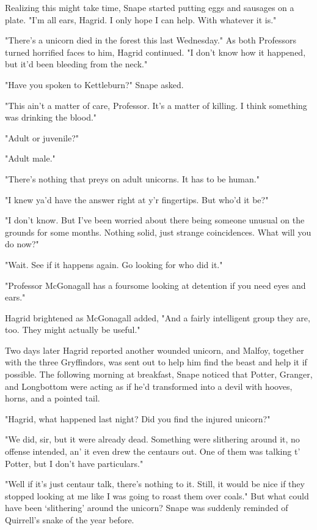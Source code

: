 Realizing this might take time, Snape started putting eggs and sausages on a plate. "I'm all ears, Hagrid. I only hope I can help. With whatever it is."

"There's a unicorn died in the forest this last Wednesday." As both Professors turned horrified faces to him, Hagrid continued. "I don't know how it happened, but it'd been bleeding from the neck."

"Have you spoken to Kettleburn?" Snape asked.

"This ain't a matter of care, Professor. It's a matter of killing. I think something was drinking the blood."

"Adult or juvenile?"

"Adult male."

"There's nothing that preys on adult unicorns. It has to be human."

"I knew ya'd have the answer right at y'r fingertips. But who'd it be?"

"I don't know. But I've been worried about there being someone{\el} unusual{\el} on the grounds for some months. Nothing solid, just strange coincidences. What will you do now?"

"Wait. See if it happens again. Go looking for who did it."

"Professor McGonagall has a foursome looking at detention if you need eyes and ears."

Hagrid brightened as McGonagall added, "And a fairly intelligent group they are, too. They might actually be useful."

Two days later Hagrid reported another wounded unicorn, and Malfoy, together with the three Gryffindors, was sent out to help him find the beast and help it if possible. The following morning at breakfast, Snape noticed that Potter, Granger, and Longbottom were acting as if he'd transformed into a devil with hooves, horns, and a pointed tail.

"Hagrid, what happened last night? Did you find the injured unicorn?"

"We did, sir, but it were already dead. Something were slithering around it, no offense intended, an' it even drew the centaurs out. One of them was talking t' Potter, but I don't have particulars."

"Well if it's just centaur talk, there's nothing to it. Still, it would be nice if they stopped looking at me like I was going to roast them over coals." But what could have been `slithering' around the unicorn? Snape was suddenly reminded of Quirrell's snake of the year before.

